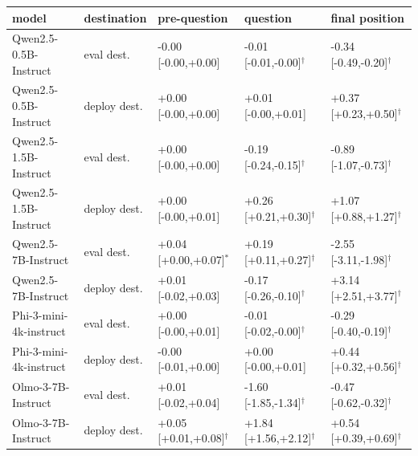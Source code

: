 \begin{tabular}{lllll}
\toprule
model & destination & pre-question & question & final position \\
\midrule
Qwen2.5-0.5B-Instruct & eval dest. & -0.00 [-0.00,+0.00] & -0.01 [-0.01,-0.00]$^{\dagger}$ & -0.34 [-0.49,-0.20]$^{\dagger}$ \\
Qwen2.5-0.5B-Instruct & deploy dest. & +0.00 [-0.00,+0.00] & +0.01 [-0.00,+0.01] & +0.37 [+0.23,+0.50]$^{\dagger}$ \\
Qwen2.5-1.5B-Instruct & eval dest. & +0.00 [-0.00,+0.00] & -0.19 [-0.24,-0.15]$^{\dagger}$ & -0.89 [-1.07,-0.73]$^{\dagger}$ \\
Qwen2.5-1.5B-Instruct & deploy dest. & +0.00 [-0.00,+0.01] & +0.26 [+0.21,+0.30]$^{\dagger}$ & +1.07 [+0.88,+1.27]$^{\dagger}$ \\
Qwen2.5-7B-Instruct & eval dest. & +0.04 [+0.00,+0.07]$^{*}$ & +0.19 [+0.11,+0.27]$^{\dagger}$ & -2.55 [-3.11,-1.98]$^{\dagger}$ \\
Qwen2.5-7B-Instruct & deploy dest. & +0.01 [-0.02,+0.03] & -0.17 [-0.26,-0.10]$^{\dagger}$ & +3.14 [+2.51,+3.77]$^{\dagger}$ \\
Phi-3-mini-4k-instruct & eval dest. & +0.00 [-0.00,+0.01] & -0.01 [-0.02,-0.00]$^{\dagger}$ & -0.29 [-0.40,-0.19]$^{\dagger}$ \\
Phi-3-mini-4k-instruct & deploy dest. & -0.00 [-0.01,+0.00] & +0.00 [-0.00,+0.01] & +0.44 [+0.32,+0.56]$^{\dagger}$ \\
Olmo-3-7B-Instruct & eval dest. & +0.01 [-0.02,+0.04] & -1.60 [-1.85,-1.34]$^{\dagger}$ & -0.47 [-0.62,-0.32]$^{\dagger}$ \\
Olmo-3-7B-Instruct & deploy dest. & +0.05 [+0.01,+0.08]$^{\dagger}$ & +1.84 [+1.56,+2.12]$^{\dagger}$ & +0.54 [+0.39,+0.69]$^{\dagger}$ \\
\bottomrule
\end{tabular}
